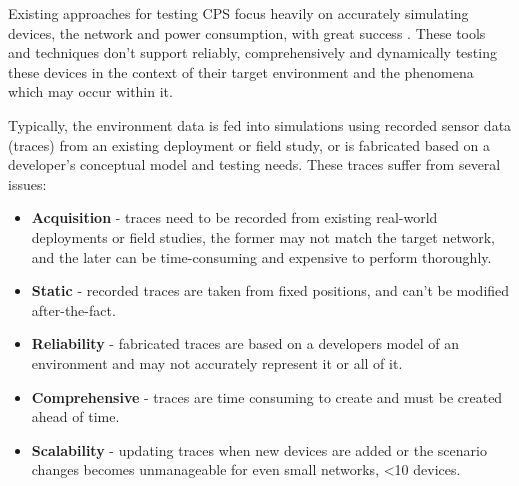 Existing approaches for testing CPS focus heavily on accurately simulating devices, the network and power consumption, with great success \cite{cooja, tossim}. These tools and techniques don't support reliably, comprehensively and dynamically testing these devices in the context of their target environment and the phenomena which may occur within it. 

Typically, the environment data is fed into simulations using recorded sensor data (traces) from an existing deployment or field study\cite{bridge,Gaglione2018}, or is fabricated based on a developer's conceptual model and testing needs. These traces suffer from several issues:
\begin{itemize}
  \item \textbf{Acquisition} - traces need to be recorded from existing real-world deployments or field studies, the former may not match the target network, and the later can be time-consuming and expensive to perform thoroughly.
  \item \textbf{Static} - recorded traces are taken from fixed positions, and can't be modified after-the-fact.
  \item \textbf{Reliability} - fabricated traces are based on a developers model of an environment and may not accurately represent it or all of it.
  \item \textbf{Comprehensive} - traces are time consuming to create and must be created ahead of time.
  \item \textbf{Scalability} - updating traces when new devices are added or the scenario changes becomes unmanageable for even small networks, <10 devices.
\end{itemize}

